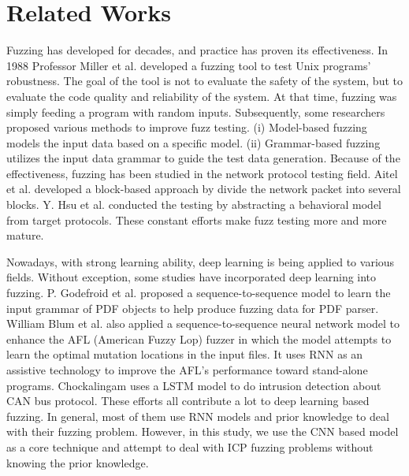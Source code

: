 \section{Related Works}
Fuzzing has developed for decades, and practice has proven its effectiveness. In 1988 Professor Miller et al. \cite{miller1995fuzz} developed a fuzzing tool to test Unix programs’ robustness. The goal of the tool is not to evaluate the safety of the system, but to evaluate the code quality and reliability of the system. At that time, fuzzing was simply feeding a program with random inputs. Subsequently, some researchers proposed various methods to improve fuzz testing. (i) Model-based fuzzing \cite{peroli2018mobster,utting2012taxonomy,lunkeit2018model} models the input data based on a specific model. (ii) Grammar-based fuzzing \cite{hodovan2018grammarinator,jero2018leveraging,guo2013gramfuzz} utilizes the input data grammar to guide the test data generation. Because of the effectiveness, fuzzing has been studied in the network protocol testing field. Aitel et al. \cite{aitel2002advantages} developed a block-based approach by divide the network packet into several blocks.  Y. Hsu et al. \cite{hsu2008model} conducted the testing by abstracting a behavioral model from target protocols. These constant efforts make fuzz testing more and more mature.

Nowadays, with strong learning ability, deep learning is being applied to various fields. Without exception, some studies have incorporated deep learning into fuzzing.  P. Godefroid et al. \cite{godefroid2008grammar} proposed a sequence-to-sequence model to learn the input grammar of PDF objects to help produce fuzzing data for PDF parser. William Blum et al. \cite{rajpal2017not} also applied a sequence-to-sequence neural network model to enhance the AFL (American Fuzzy Lop) \cite{ALFfuzzer} fuzzer in which the model attempts to learn the optimal mutation locations in the input files. It uses RNN as an assistive technology to improve the AFL’s performance toward stand-alone programs. Chockalingam \cite{chockalingamdetecting} uses a LSTM model to do intrusion detection about CAN bus protocol. These efforts all contribute a lot to deep learning based fuzzing. In general, most of them use RNN models and prior knowledge to deal with their fuzzing problem. However, in this study, we use the CNN based model as a core technique and attempt to deal with ICP fuzzing problems without knowing the prior knowledge.

